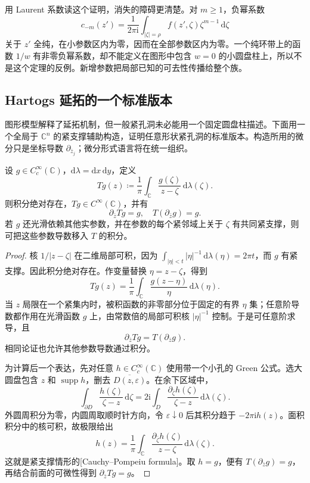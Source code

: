 用 Laurent 系数读这个证明，消失的障碍更清楚。对 \(m\ge1\)，负幂系数
\[
 c_{-m}(z')=\frac1{2\pi\mathrm{i}}
 \int_{|\zeta|=\rho}f(z',\zeta)\zeta^{m-1}\,\mathrm{d}\zeta
\]
关于 \(z'\) 全纯，在小参数区内为零，因而在全部参数区内为零。一个纯环带上的函数 \(1/w\) 有非零负幂系数，却不能定义在图形中包含 \(w=0\) 的小圆盘柱上，所以不是这个定理的反例。新增参数把局部已知的可去性传播给整个族。

\subsection{Hartogs 延拓的一个标准版本}
\label{b3:subsec:290203}

图形模型解释了延拓机制，但一般紧孔洞未必能用一个固定圆盘柱描述。下面用一个全局于 \(\mathbb C^n\) 的紧支撑辅助构造，证明任意形状紧孔洞的标准版本。构造所用的微分只是坐标导数 \(\partial_{\bar z_j}\)；微分形式语言将在统一组织。

\begin{lemma}[一元 Cauchy 变换]\label{b3:lem:29-cauchy-transform}
设 \(g\in C_c^\infty(\mathbb C)\)，\(\mathrm{d}\lambda=\mathrm{d}x\,\mathrm{d}y\)，定义
\[
 Tg(z)\coloneqq\frac1\pi\int_{\mathbb C}
 \frac{g(\zeta)}{z-\zeta}\,\mathrm{d}\lambda(\zeta).
\]
则积分绝对存在，\(Tg\in C^\infty(\mathbb C)\)，并有
\[
 \partial_{\bar z}Tg=g,
 \quad T(\partial_{\bar z}g)=g.
\]
若 \(g\) 还光滑依赖其他实参数，并在参数的每个紧邻域上关于 \(\zeta\) 有共同紧支撑，则可把这些参数导数移入 \(T\) 的积分。
\end{lemma}
\begin{proof}
核 \(1/|z-\zeta|\) 在二维局部可积，因为 \(\int_{|\eta|<t}|\eta|^{-1}\,\mathrm{d}\lambda(\eta)=2\pi t\)，而 \(g\) 有紧支撑。因此积分绝对存在。作变量替换 \(\eta=z-\zeta\)，得到
\[
 Tg(z)=\frac1\pi\int_{\mathbb C}\frac{g(z-\eta)}{\eta}\,\mathrm{d}\lambda(\eta).
\]
当 \(z\) 局限在一个紧集内时，被积函数的非零部分位于固定的有界 \(\eta\) 集；任意阶导数都作用在光滑函数 \(g\) 上，由常数倍的局部可积核 \(|\eta|^{-1}\) 控制。于是可任意阶求导，且
\[
 \partial_{\bar z}Tg=T(\partial_{\bar z}g).
\]
相同论证也允许其他参数导数通过积分。

为计算后一个表达，先对任意 \(h\in C_c^\infty(\mathbb C)\) 使用带一个小孔的 Green 公式。选大圆盘包含 \(z\) 和 \(\operatorname{supp}h\)，删去 \(\overline{D(z,\varepsilon)}\)。在余下区域中，
\[
 \int_{\partial D}\frac{h(\zeta)}{\zeta-z}\,\mathrm{d}\zeta
 =2\mathrm{i}\int_D\frac{\partial_{\bar\zeta}h(\zeta)}{\zeta-z}
 \,\mathrm{d}\lambda(\zeta).
\]
外圆周积分为零，内圆周取顺时针方向，令 \(\varepsilon\downarrow0\) 后其积分趋于 \(-2\pi\mathrm{i}h(z)\)。面积积分中的核可积，故极限给出
\[
 h(z)=\frac1\pi\int_{\mathbb C}
 \frac{\partial_{\bar\zeta}h(\zeta)}{z-\zeta}\,\mathrm{d}\lambda(\zeta).
\]
这就是紧支撑情形的[Cauchy--Pompeiu formula]。取 \(h=g\)，便有 \(T(\partial_{\bar z}g)=g\)，再结合前面的可微性得到 \(\partial_{\bar z}Tg=g\)。
\end{proof}

